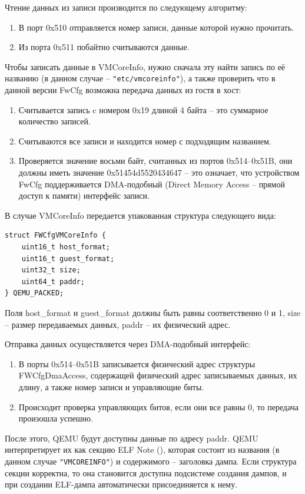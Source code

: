 \documentclass{mipt-thesis-bs}
\begin{document}
Чтение данных из записи производится по следующему алгоритму:
\begin{enumerate}
\item В порт 0x510 отправляется номер записи, данные которой нужно прочитать.
\item Из порта 0x511 побайтно считываются данные.
\end{enumerate}

Чтобы записать данные в VMCoreInfo, нужно сначала эту найти запись по её названию (в данном случае -- \texttt{"etc/vmcoreinfo"}), а также проверить что в данной версии FwCfg возможна передача данных из гостя в хост:

\begin{enumerate}
\item Считывается запись c номером 0x19 длиной 4 байта -- это суммарное количество записей.
\item Считываются все записи и находится номер с подходящим названием.
\item Проверяется значение восьми байт, считанных из портов 0x514--0x51B, они должны иметь значение 0x51454d5520434647 -- это означает, что устройством FwCfg поддерживается DMA-подобный (Direct Memory Access -- прямой доступ к памяти) интерфейс записи.
\end{enumerate}

В случае VMCoreInfo передается упакованная структура следующего вида:

\begin{verbatim}
struct FWCfgVMCoreInfo {
    uint16_t host_format;
    uint16_t guest_format;
    uint32_t size;
    uint64_t paddr;
} QEMU_PACKED;
\end{verbatim}

Поля host{\_}format и guest{\_}format должны быть равны соответственно 0 и 1, size -- размер передаваемых данных, paddr -- их физический адрес.

Отправка данных осуществляется через DMA-подобный интерфейс:

\begin{enumerate}
\item В порты 0x514--0x51B записывается физический адрес структуры FWCfgDmaAccess, содержащей физический адрес записываемых данных, их длину, а также номер записи и управляющие биты.
\item Происходит проверка управляющих битов, если они все равны 0, то передача произошла успешно.
\end{enumerate}

После этого, QEMU будут доступны данные по адресу paddr. QEMU интерпретирует их как секцию ELF Note (), которая состоит из названия (в данном случае \texttt{"VMCOREINFO"}) и содержимого -- заголовка дампа\cite{elfspec}. Если структура секции корректна, то она становится доступна подсистеме создания дампов, и при создании ELF-дампа автоматически присоединяется к нему.
\end{document}
